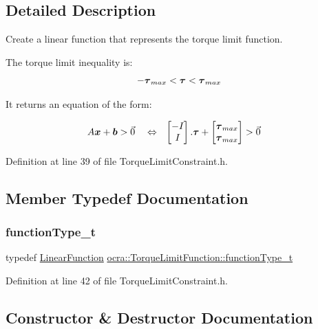 \subsection{Detailed Description}
Create a linear function that represents the torque limit function. 

The torque limit inequality is\+: \[ - \mbox{\boldmath${\tau}$}_{max} < \mbox{\boldmath${\tau}$} < \mbox{\boldmath${\tau}$}_{max} \]

It returns an equation of the form\+:

\begin{align*} A \mbox{\boldmath${x}$} + \mbox{\boldmath${b}$} &> \vec{0} & &\Leftrightarrow & \begin{bmatrix} - I_{} \\ I_{} \end{bmatrix} . \mbox{\boldmath${\tau}$} + \begin{bmatrix} \mbox{\boldmath${\tau}$}_{max} \\ \mbox{\boldmath${\tau}$}_{max} \end{bmatrix} &> \vec{0} \end{align*} 

Definition at line 39 of file Torque\+Limit\+Constraint.\+h.



\subsection{Member Typedef Documentation}
\hypertarget{classocra_1_1TorqueLimitFunction_a0c9d97d4e11ee173ae359698d6c95b25}{}\label{classocra_1_1TorqueLimitFunction_a0c9d97d4e11ee173ae359698d6c95b25} 
\subsubsection{\texorpdfstring{function\+Type\+\_\+t}{functionType\_t}}
{\footnotesize\ttfamily typedef \hyperlink{classocra_1_1LinearFunction}{Linear\+Function} \hyperlink{classocra_1_1TorqueLimitFunction_a0c9d97d4e11ee173ae359698d6c95b25}{ocra\+::\+Torque\+Limit\+Function\+::function\+Type\+\_\+t}}



Definition at line 42 of file Torque\+Limit\+Constraint.\+h.



\subsection{Constructor \& Destructor Documentation}
\hypertarget{classocra_1_1TorqueLimitFunction_a3ca04338256c4a0bf484f29dc7aeb06d}{}\label{classocra_1_1TorqueLimitFunction_a3ca04338256c4a0bf484f29dc7aeb06d} 
